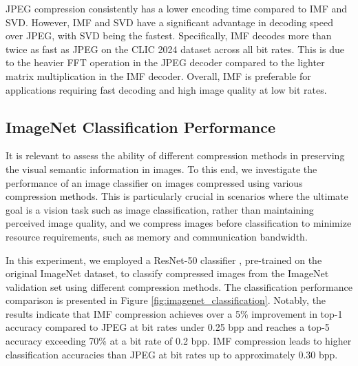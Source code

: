 JPEG compression consistently has a lower encoding time compared to IMF and SVD. However, IMF and SVD have a significant advantage in decoding speed over JPEG, with SVD being the fastest. Specifically, IMF decodes more than twice as fast as JPEG on the CLIC 2024 dataset across all bit rates. This is due to the heavier FFT operation in the JPEG decoder compared to the lighter matrix multiplication in the IMF decoder. Overall, IMF is preferable for applications requiring fast decoding and high image quality at low bit rates.


\subsection{ImageNet Classification Performance} \label{sec:imagenet_classification_performance}

It is relevant to assess the ability of different compression methods in preserving the visual semantic information in images. To this end, we investigate the performance of an image classifier on images compressed using various compression methods. This is particularly crucial in scenarios where the ultimate goal is a vision task such as image classification, rather than maintaining perceived image quality, and we compress images before classification to minimize resource requirements, such as memory and communication bandwidth.

In this experiment, we employed a ResNet-50 classifier \cite{he2016deep}, pre-trained on the original ImageNet \cite{deng2009imagenet} dataset, to classify compressed images from the ImageNet validation set using different compression methods. The classification performance comparison is presented in Figure \ref{fig:imagenet_classification}. Notably, the results indicate that IMF compression achieves over a 5\% improvement in top-1 accuracy compared to JPEG at bit rates under 0.25 bpp and reaches a top-5 accuracy exceeding 70\% at a bit rate of 0.2 bpp. IMF compression leads to higher classification accuracies than JPEG at bit rates up to approximately 0.30 bpp. 


